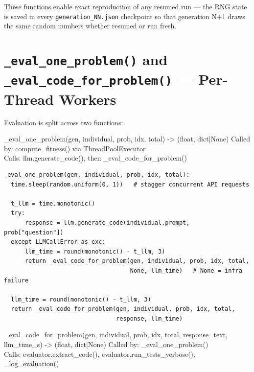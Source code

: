 \documentclass[11pt,a4paper]{report}
\newcommand{\fn}[1]{\texttt{#1}}
\begin{document}
These functions enable exact reproduction of any resumed run --- the RNG state is
saved in every \fn{generation\_NN.json} checkpoint so that generation N+1 draws
the same random numbers whether resumed or run fresh.

\section{\fn{\_eval\_one\_problem()} and \fn{\_eval\_code\_for\_problem()} --- Per-Thread Workers}

Evaluation is split across two functions:

\begin{spec}{\_eval\_one\_problem(gen, individual, prob, idx, total) -> (float, dict|None)}
Called by: compute\_fitness() via ThreadPoolExecutor \\
Calls: llm.generate\_code(), then \_eval\_code\_for\_problem()
\end{spec}

\begin{lstlisting}[style=chain]
_eval_one_problem(gen, individual, prob, idx, total):
  time.sleep(random.uniform(0, 1))   # stagger concurrent API requests

  t_llm = time.monotonic()
  try:
      response = llm.generate_code(individual.prompt, prob["question"])
  except LLMCallError as exc:
      llm_time = round(monotonic() - t_llm, 3)
      return _eval_code_for_problem(gen, individual, prob, idx, total,
                                    None, llm_time)   # None = infra failure

  llm_time = round(monotonic() - t_llm, 3)
  return _eval_code_for_problem(gen, individual, prob, idx, total,
                                response, llm_time)
\end{lstlisting}

\begin{spec}{\_eval\_code\_for\_problem(gen, individual, prob, idx, total, response\_text, llm\_time\_s) -> (float, dict|None)}
Called by: \_eval\_one\_problem() \\
Calls: evaluator.extract\_code(), evaluator.run\_tests\_verbose(), \_log\_evaluation()
\end{spec}
\end{document}
